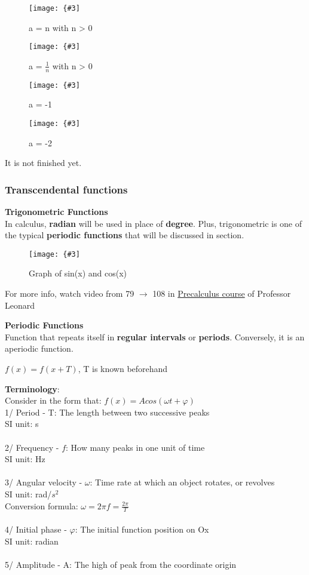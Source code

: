 \documentclass[12pt,a4paper]{article}
\newcommand{\img}[3]{
	\texttt{[image: \{\#3]}}}
\begin{document}
\begin{figure}[h!]
\centering\img{7cm}{4cm}{Picture/Univariate_calculus/Categories/2.png}
\caption{a = n with n > 0}
\centering\img{7cm}{4cm}{Picture/Univariate_calculus/Categories/3.png}
\caption{a = $\frac{1}{n}$ with n > 0}
\end{figure}

\newpage

\begin{figure}[h!]
\centering\img{6cm}{4cm}{Picture/Univariate_calculus/Categories/4.png}
\caption{a = -1}
\centering\img{6cm}{4cm}{Picture/Univariate_calculus/Categories/5.png}
\caption{a = -2}
\end{figure}

It is not finished yet.

\subsubsection{Transcendental functions}
\Large \textbf{Trigonometric Functions} \vspace{3mm}\\
\normalsize \indent In calculus, \textbf{radian} will be used in place of \textbf{degree}. Plus, trigonometric is one of the typical \textbf{periodic functions} that will be discussed in section.
\begin{figure}[h!]
\centering\img{10cm}{4cm}{Picture/Univariate_calculus/Categories/6.png}\caption{Graph of sin(x) and cos(x)}
\end{figure}
\newline
For more info, watch video from 79 $\rightarrow$ 108 in \hyperlink{https://youtube.com/playlist?list=PLDesaqWTN6ESsmwELdrzhcGiRhk5DjwLP}{Precalculus course}  of Professor Leonard

\noindent\Large \textbf{Periodic Functions}\\ 
\normalsize \indent Function that repeats itself in \textbf{regular intervals} or \textbf{periods}. Conversely, it is an aperiodic function.
\begin{center}
$f(x) = f(x + T)$, T is known beforehand
\end{center}
\textbf{Terminology}:\\
Consider in the form that: $f(x) = Acos(\omega t + \varphi)$\\
1/ Period - T: The length between two successive peaks\\
SI unit: s\\\\
2/ Frequency - $f$: How many peaks in one unit of time\\
SI unit: Hz\\\\
3/ Angular velocity - $\omega$: Time rate at which an object rotates, or revolves\\
SI unit: rad/$s^2$\\
Conversion formula: $\omega = 2\pi f = \frac{2\pi}{T}$\\\\
4/ Initial phase - $\varphi$: The initial function position on Ox\\
SI unit: radian\\\\
5/ Amplitude - A: The high of peak from the coordinate origin
\end{document}
